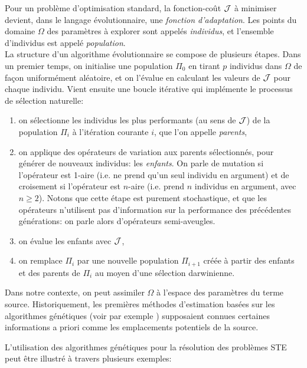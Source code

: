  Pour un problème d'optimisation standard, la fonction-coût ${\mathcal{J}}$ à minimiser devient, dans le langage évolutionnaire, une \textit{fonction d'adaptation}. Les points du domaine $\Omega$ des paramètres à explorer sont appelés \textit{individus}, et l'ensemble d'individus est appelé \textit{population}. \\
 La structure d'un algorithme évolutionnaire se compose de plusieurs étapes. Dans un premier temps, on initialise une population $\Pi_0$ en tirant $p$ individus dans $\Omega$ de façon uniformément aléatoire, et on l'évalue en calculant les valeurs de ${\mathcal{J}}$ pour chaque individu. Vient ensuite une boucle itérative qui implémente le processus de sélection naturelle:
 \begin{enumerate}
 	\item on sélectionne les individus les plus performants (au sens de ${\mathcal{J}}$) de la population $\Pi_i$ à l'itération courante $i$, que l'on appelle \textit{parents},
 	\item on applique des opérateurs de variation aux parents sélectionnés, pour générer de nouveaux individus: les \textit{enfants}. On parle de mutation si l'opérateur est 1-aire (i.e. ne prend qu'un seul individu en argument) et de croisement si l'opérateur est $n$-aire (i.e. prend $n$ individus en argument, avec $n \geq 2$). Notons que cette étape est purement stochastique, et que les opérateurs n'utilisent pas d'information sur la performance des précédentes générations: on parle alors d'opérateurs semi-aveugles.
 	\item on évalue les enfants avec ${\mathcal{J}}$,
 	\item on remplace $\Pi_i$  par une nouvelle population $\Pi_{i+1}$ créée à partir des enfants et des parents de $\Pi_i$ au moyen d'une sélection darwinienne.\\
 \end{enumerate}
 
 Dans notre contexte, on peut assimiler $\Omega$ à l'espace des paramètres du terme source. Historiquement, les premières méthodes d'estimation basées sur les algorithmes génétiques (voir par exemple \cite{Haupt2005}) supposaient connues certaines informations a priori comme les emplacements potentiels de la source. 
 
 L'utilisation des algorithmes génétiques pour la résolution des problèmes STE peut être illustré à travers plusieurs exemples: \\
 
